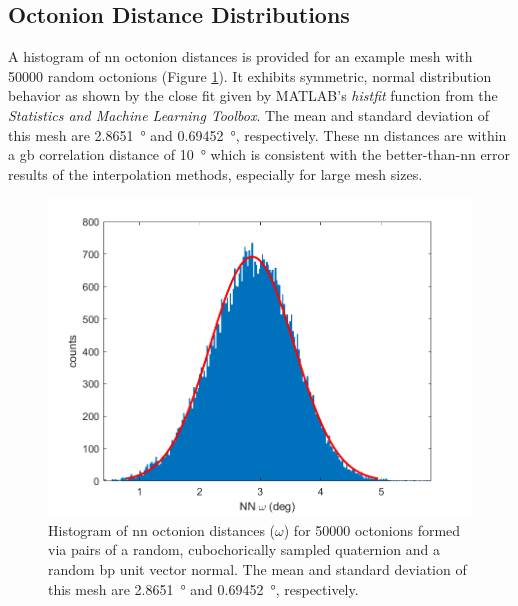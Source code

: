 \documentclass[preprint,12pt]{elsarticle}
\begin{document}
\subsection{Octonion Distance Distributions} \label{sec:results:dist}
A histogram of \gls{nn} octonion distances is provided for an example mesh with \num{50000} random octonions (Figure \ref{fig:nndist}). It exhibits symmetric, normal distribution behavior as shown by the close fit given by MATLAB's \textit{histfit} function from the \textit{Statistics and Machine Learning Toolbox}.
The mean and standard deviation of this mesh are \SI{2.8651}{\degree} and \SI{0.69452}{\degree}, respectively. These \gls{nn} distances are within a \gls{gb} correlation distance of \SI{10}{\degree} \cite{rohrerComparingCalculatedMeasured2010} which is consistent with the better-than-\gls{nn} error results of the interpolation methods, especially for large mesh sizes.


\begin{figure}
\centering
\includegraphics{disthist50000.png}
\caption{Histogram of \acrlong{nn} octonion distances ($\omega$) for \num{50000} octonions formed via pairs of a random, cubochorically sampled quaternion and a random \acrlong{bp} unit vector normal. The mean and standard deviation of this mesh are \SI{2.8651}{\degree} and \SI{0.69452}{\degree}, respectively.}
\label{fig:nndist}
\end{figure}
\end{document}
